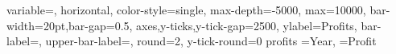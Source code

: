 \documentclass[12pt]{article}
\begin{document}
\renewcommand\DTLBarStyle{%
 draw,shade,shading=axis,left color=red,right color=blue
 }
 \DTLbarchart
{
 variable=\theProfit,
 horizontal,
 color-style=single,
 max-depth=-5000,
 max=10000,
 bar-width=20pt,bar-gap=0.5,
 axes,y-ticks,y-tick-gap=2500,
 ylabel={Profits},
 bar-label={\theYear},
 upper-bar-label={\DTLbarvalue},
 round=2,
 y-tick-round=0
}
{profits}%
 {%
 \theYear=Year,
 \theProfit=Profit
} 
\end{document}
